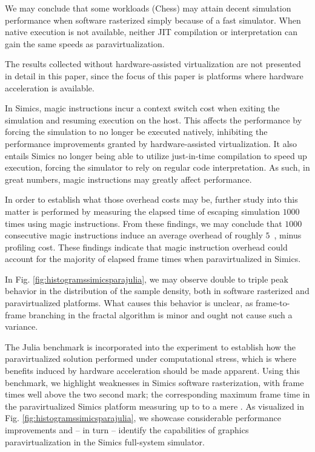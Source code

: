 We may conclude that some workloads (Chess) may attain decent simulation performance when software rasterized simply because of a fast simulator.
When native execution is not available, neither JIT compilation or interpretation can gain the same speeds as paravirtualization.

The results collected without hardware-assisted virtualization are not presented in detail in this paper, since the focus of this paper is platforms where hardware acceleration is available.

In Simics, magic instructions incur a context switch cost when exiting the simulation and resuming execution on the host.
This affects the performance by forcing the simulation to no longer be executed natively, inhibiting the performance improvements granted by hardware-assisted virtualization.
It also entails Simics no longer being able to utilize just-in-time compilation to speed up execution, forcing the simulator to rely on regular code interpretation.
As such, in great numbers, magic instructions may greatly affect performance.

In order to establish what those overhead costs may be, further study into this matter is performed by measuring the elapsed time of escaping simulation $1000$ times using magic instructions.
From these findings, we may conclude that $1000$ consecutive magic instructions induce an average overhead of roughly $5$~\milli\second , minus profiling cost.
These findings indicate that magic instruction overhead could account for the majority of elapsed frame times when paravirtualized in Simics.

In Fig. \ref{fig:histogramssimicsparajulia}, we may observe double to triple peak behavior in the distribution of the sample density, both in software rasterized and paravirtualized platforms.
What causes this behavior is unclear, as frame-to-frame branching in the fractal algorithm is minor and ought not cause such a variance.

The Julia benchmark is incorporated into the experiment to establish how the paravirtualized solution performed under computational stress, which is where benefits induced by hardware acceleration should be made apparent.
Using this benchmark, we highlight weaknesses in Simics software rasterization, with frame times well above the two second mark; the corresponding maximum frame time in the paravirtualized Simics platform measuring up to to a mere  \milli\second .
As visualized in Fig. \ref{fig:histogramssimicsparajulia}, we showcase considerable performance improvements and -- in turn -- identify the capabilities of graphics paravirtualization in the Simics full-system simulator.
